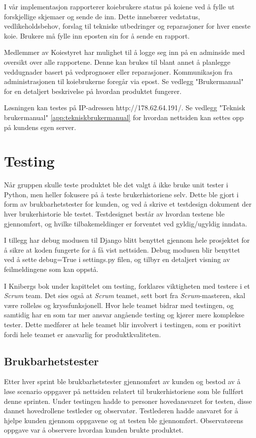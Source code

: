 \documentclass[12pt,a4paper,norsk]{article}
\begin{document}
  I vår implementasjon rapporterer koiebrukere status på koiene ved å fylle ut forskjellige skjemaer og sende de inn. Dette innebærer vedstatus, vedlikeholdsbehov, forslag til tekniske utbedringer og reparasjoner for hver eneste koie. Brukere må fylle inn eposten sin for å sende en rapport.

  Medlemmer av Koiestyret har mulighet til å logge seg inn på en adminside med oversikt over alle rapportene. Denne kan brukes til blant annet å planlegge veddugnader basert på vedprognoser eller reparasjoner. Kommunikasjon fra administrasjonen til koiebrukerne foregår via epost. Se vedlegg "Brukermanual" for en detaljert beskrivelse på hvordan produktet fungerer.

  Løsningen kan testes på IP-adressen http://178.62.64.191/. Se vedlegg "Teknisk brukermanual" \cref{app:tekniskbrukermanual} for hvordan nettsiden kan settes opp på kundens egen server.

  \section{Testing}

Når gruppen skulle teste produktet ble det valgt å ikke bruke unit tester i Python, men heller fokusere på å teste brukerhistoriene selv. Dette ble gjort i form av brukbarhetstester for kunden, og ved å skrive et testdesign dokument der hver brukerhistorie ble testet. Testdesignet består av hvordan testene ble gjennomført, og hvilke tilbakemeldinger er forventet ved gyldig/ugyldig inndata.

I tillegg har debug modusen til Django blitt benyttet gjennom hele prosjektet for å sikre at koden fungerte for å få vist nettsiden. Debug modusen blir benyttet ved å sette debug=True i settings.py filen, og tilbyr en detaljert visning av feilmeldingene som kan oppstå.

I Knibergs bok under kapittelet om testing\cite[side 128-131]{kniberg}, forklares viktigheten med testere i et \textit{Scrum} team. Det sies også at \textit{Scrum} teamet, sett bort fra \textit{Scrum}-masteren, skal være rolleløs og kryssfunksjonell. Hvor hele teamet bidrar med testingen, og samtidig har en som tar mer ansvar angående testing og kjører mere komplekse tester. Dette medfører at hele teamet blir involvert i testingen, som er positivt fordi hele teamet er ansvarlig for produktkvaliteten.

 \subsection{Brukbarhetstester}
Etter hver sprint ble brukbarhetstester gjennomført av kunden og bestod av å løse scenario oppgaver på nettsiden relatert til brukerhistoriene som ble fullført denne sprinten. Under testingen hadde to personer hovedansvaret for testen, disse dannet hovedrollene testleder og observatør. Testlederen hadde ansvaret for å hjelpe kunden gjennom oppgavene og at testen ble gjennomført. Observatørens oppgave var å observere hvordan kunden brukte produktet.
\end{document}
